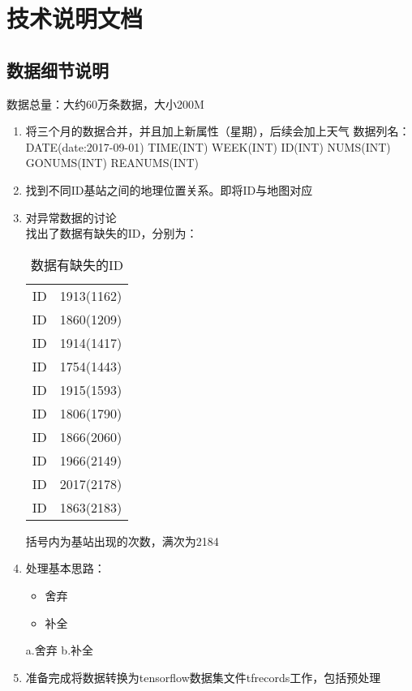 
\chapter{技术说明文档} %
\label{AppendixA} %
\section{数据细节说明}
数据总量：大约60万条数据，大小200M
\begin{enumerate}
	\item 将三个月的数据合并，并且加上新属性（星期），后续会加上天气
	数据列名：
	DATE(date:2017-09-01)	TIME(INT)		WEEK(INT)	ID(INT)	NUMS(INT)	GONUMS(INT)	REANUMS(INT)
	\item 找到不同ID基站之间的地理位置关系。即将ID与地图对应
	\item 对异常数据的讨论 \\
	找出了数据有缺失的ID，分别为：\\
	\begin{table}
	\label{tb:id}
	\centering
	\caption{数据有缺失的ID}
	\begin{tabular}{c|c}
	\hline
	\hline
	ID & 1913(1162) \\
	ID & 1860(1209) \\
	ID & 1914(1417) \\
	ID & 1754(1443) \\
	ID & 1915(1593) \\
	ID & 1806(1790) \\
	ID & 1866(2060) \\
	ID & 1966(2149) \\
	ID & 2017(2178) \\
	ID & 1863(2183) \\
	\hline
	\hline
	\end{tabular}
	\end{table}
	括号内为基站出现的次数，满次为2184
	\item 处理基本思路：
	\begin{itemize}
		\item 舍弃
		\item 补全
	\end{itemize}
		a.舍弃
		b.补全
	\item 准备完成将数据转换为tensorflow数据集文件tfrecords工作，包括预处理
\end{enumerate}
